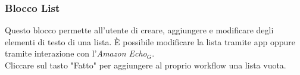\subsubsection{Blocco List}
Questo blocco permette all'utente di creare, aggiungere e modificare degli elementi di testo di una lista.
È possibile modificare la lista tramite app oppure tramite interazione con l'\textit{Amazon Echo$_{G}$}. \\ 
Cliccare sul tasto "Fatto" per aggiungere al proprio workflow una lista vuota.

